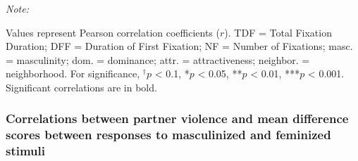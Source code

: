 \documentclass[
  bookmarksnumbered]{article}
\begin{document}
\begin{landscape}
\begin{table}[H]
\begin{threeparttable}
\begin{tabular}[t]
\bottomrule
\end{tabular}
\begin{tablenotes}[para]
\item \textit{Note: } 
\item Values represent Pearson correlation coefficients ($r$). TDF = Total Fixation Duration; DFF = Duration of First Fixation;
                            NF = Number of Fixations; masc. = masculinity;
                            dom. = dominance; attr. = attractiveness;  
                            neighbor. = neighborhood. For significance, $^{\dagger}p$ < 0.1, *$p$ < 0.05, **$p$ < 0.01, ***$p$ < 0.001. Significant correlations are in bold.
\end{tablenotes}
\end{threeparttable}
\end{table}
\end{landscape}

\subsubsection{Correlations between partner violence and mean difference scores between responses to masculinized and feminized stimuli}\label{correlations-between-partner-violence-and-mean-difference-scores-between-responses-to-masculinized-and-feminized-stimuli}
\end{document}
